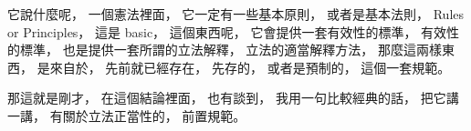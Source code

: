 \hypertarget{w02:cue:2610}{}它說什麼呢，
\hypertarget{w02:cue:2611}{}一個憲法裡面，
\hypertarget{w02:cue:2612}{}它一定有一些基本原則，
\hypertarget{w02:cue:2613}{}或者是基本法則，
\hypertarget{w02:cue:2614}{}Rules or Principles，
\hypertarget{w02:cue:2615}{}這是 basic，
\hypertarget{w02:cue:2616}{}這個東西呢，
\hypertarget{w02:cue:2617}{}它會提供一套有效性的標準，
\hypertarget{w02:cue:2618}{}有效性的標準，
\hypertarget{w02:cue:2619}{}也是提供一套所謂的立法解釋，
\hypertarget{w02:cue:2620}{}立法的適當解釋方法，
\hypertarget{w02:cue:2621}{}那麼這兩樣東西，
\hypertarget{w02:cue:2622}{}是來自於，
\hypertarget{w02:cue:2623}{}先前就已經存在，
\hypertarget{w02:cue:2624}{}先存的，
\hypertarget{w02:cue:2625}{}或者是預制的，
\hypertarget{w02:cue:2626}{}這個一套規範。

\hypertarget{w02:cue:2627}{}那這就是剛才，
\hypertarget{w02:cue:2628}{}在這個結論裡面，
\hypertarget{w02:cue:2629}{}也有談到，
\hypertarget{w02:cue:2630}{}我用一句比較經典的話，
\hypertarget{w02:cue:2631}{}把它講一講，
\hypertarget{w02:cue:2632}{}有關於立法正當性的，
\hypertarget{w02:cue:2633}{}前置規範。


